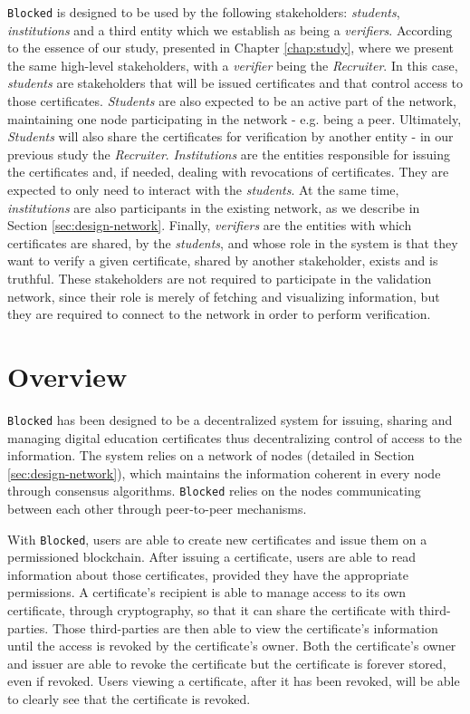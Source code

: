 \texttt{Blocked} is designed to be used by the following stakeholders: \textit{students}, \textit{institutions} and a third entity which we establish as being a \textit{verifiers}. According to the essence of our study, presented in Chapter \ref{chap:study}, where we present the same high-level stakeholders, with a \textit{verifier} being the \textit{Recruiter}. In this case, \textit{students} are stakeholders that will be issued certificates and that control access to those certificates. \textit{Students} are also expected to be an active part of the network, maintaining one node participating in the network - e.g. being a peer. Ultimately, \textit{Students} will also share the certificates for verification by another entity - in our previous study the \emph{Recruiter}. \textit{Institutions} are the entities responsible for issuing the certificates and, if needed, dealing with revocations of certificates. They are expected to only need to interact with the \textit{students}. At the same time, \emph{institutions} are also participants in the existing network, as we describe in Section \ref{sec:design-network}. Finally, \emph{verifiers} are the entities with which certificates are shared, by the \textit{students}, and whose role in the system is that they want to verify a given certificate, shared by another stakeholder, exists and is truthful. These stakeholders are not required to participate in the validation network, since their role is merely of fetching and visualizing information, but they are required to connect to the network in order to perform verification.

\section{Overview}

\texttt{Blocked} has been designed to be a decentralized system for issuing, sharing and managing digital education certificates thus decentralizing control of access to the information. The system relies on a network of nodes (detailed in Section \ref{sec:design-network}), which maintains the information coherent in every node through consensus algorithms. \texttt{Blocked} relies on the nodes communicating between each other through peer-to-peer mechanisms. 

With \texttt{Blocked}, users are able to create new certificates and issue them on a permissioned blockchain. After issuing a certificate, users are able to read information about those certificates, provided they have the appropriate permissions. A certificate's recipient is able to manage access to its own certificate, through cryptography, so that it can share the certificate with third-parties. Those third-parties are then able to view the certificate's information until the access is revoked by the certificate's owner. Both the certificate's owner and issuer are able to revoke the certificate but the certificate is forever stored, even if revoked. Users viewing a certificate, after it has been revoked, will be able to clearly see that the certificate is revoked.

